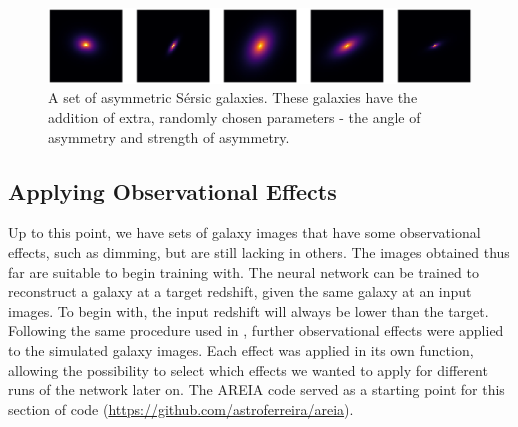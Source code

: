 \documentclass[fleqn,usenatbib]{mnras}
\begin{document}
\begin{figure}
	\includegraphics[width=\columnwidth]{Figures/asym-galaxy-v2.png}
    \caption{A set of asymmetric S\'ersic galaxies. These galaxies have the addition of extra, randomly chosen parameters - the angle of asymmetry and strength of asymmetry.}
    \label{fig:asym-galaxy}
\end{figure}

\subsection{Applying Observational Effects} %
\label{sec:observe}
Up to this point, we have sets of galaxy images that have some observational effects, such as dimming, but are still lacking in others. The images obtained thus far are suitable to begin training with. The neural network can be trained to reconstruct a galaxy at a target redshift, given the same galaxy at an input images. To begin with, the input redshift will always be lower than the target. Following the same procedure used in \citet{Barden2008}, further observational effects were applied to the simulated galaxy images. Each effect was applied in its own function, allowing the possibility to select which effects we wanted to apply for different runs of the network later on. The AREIA \citet{Ferreira2018} code served as a starting point for this section of code (\url{https://github.com/astroferreira/areia}).
\end{document}
